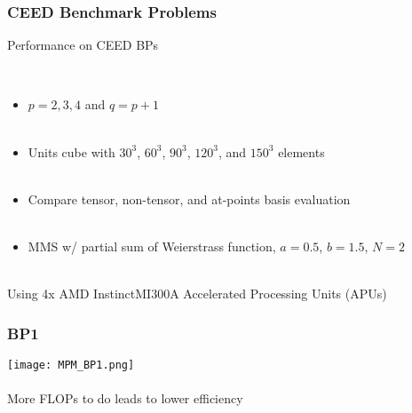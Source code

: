 \documentclass{beamer}
\begin{document}
\begin{frame}
\begin{center}
\frametitle{CEED Benchmark Problems}

Performance on CEED BPs

~\\

\begin{itemize}

\item $p = 2, 3, 4$ and $q = p + 1$\\

~\\

\item Units cube with $30^3$, $60^3$, $90^3$, $120^3$, and $150^3$ elements\\

~\\

\item Compare tensor, non-tensor, and at-points basis evaluation\\

~\\

\item MMS w/ partial sum of Weierstrass function, $a = 0.5$, $b = 1.5$, $N = 2$\\

\end{itemize}

~\\

Using 4x AMD Instinct\texttrademark MI300A Accelerated Processing Units (APUs)

\end{center}
\end{frame}


\begin{frame}
\begin{center}
\frametitle{BP1}

\texttt{[image: MPM\_BP1.png]}\\

~\\

More FLOPs to do leads to lower efficiency

\end{center}
\end{frame}

\end{document}
